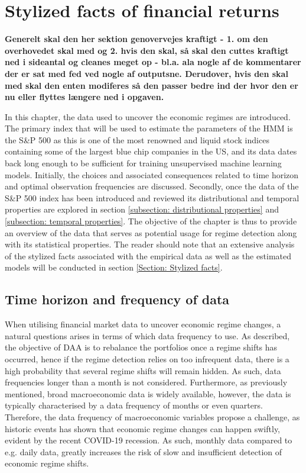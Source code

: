\section{Stylized facts of financial returns}
\label{section: Data}

\textbf{Generelt skal den her sektion genovervejes kraftigt - 1. om den overhovedet skal med og 2. hvis den skal, så skal den cuttes kraftigt ned i sideantal og cleanes meget op - bl.a. ala nogle af de kommentarer der er sat med fed ved nogle af outputsne. Derudover, hvis den skal med skal den enten modiferes så den passer bedre ind der hvor den er nu eller flyttes længere ned i opgaven.}

In this chapter, the data used to uncover the economic regimes are introduced. The primary index that will be used to estimate the parameters of the HMM is the S\&P 500 as this is one of the most renowned and liquid stock indices containing some of the largest blue chip companies in the US, and its data dates back long enough to be sufficient for training unsupervised machine learning models. Initially, the choices and associated consequences related to time horizon and optimal observation frequencies are discussed. Secondly, once the data of the S\&P 500 index has been introduced and reviewed its distributional and temporal properties are explored in section \ref{subsection: distributional properties} and \ref{subsection: temporal properties}. The objective of the chapter is thus to provide an overview of the data that serves as potential usage for regime detection along with its statistical properties. The reader should note that an extensive analysis of the stylized facts associated with the empirical data as well as the estimated models will be conducted in section \ref{Section: Stylized facts}.  

\subsection*{Time horizon and frequency of data}
\label{subsection: Data frequency}
When utilising financial market data to uncover economic regime changes, a natural questions arises in terms of which data frequency to use. As described, the objective of DAA is to rebalance the portfolios once a regime shifts has occurred, hence if the regime detection relies on too infrequent data, there is a high probability that several regime shifts will remain hidden. As such, data frequencies longer than a month is not considered. Furthermore, as previously mentioned, broad macroeconomic data is widely available, however, the data is typically characterised by a data frequency of months or even quarters. Therefore, the data frequency of macroeconomic variables propose a challenge, as historic events has shown that economic regime changes can happen swiftly, evident by the recent COVID-19 recession. As such, monthly data compared to e.g. daily data, greatly increases the risk of slow and insufficient detection of economic regime shifts.
 

